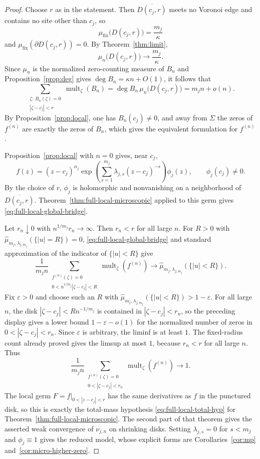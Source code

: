 \documentclass[reqno]{article}
\theoremstyle{definition}
\theoremstyle{remark}
\theoremstyle{plain}
\begin{document}
\begin{proof}
Choose $r$ as in the statement. Then $\overline{D(c_j,r)}$ meets no Voronoi edge and contains no site other than $c_j$, so
$$\mu_{\mathrm{fix}}\bigl(D(c_j,r)\bigr)=\frac{m_j}{\kappa}$$
and $\mu_{\mathrm{fix}}(\partial D(c_j,r))=0$. By Theorem~\ref{thm:limit},
$$\mu_n\bigl(D(c_j,r)\bigr)\longrightarrow \frac{m_j}{\kappa}.$$
Since $\mu_n$ is the normalized zero-counting measure of $B_n$ and Proposition~\ref{prop:deg} gives $\deg B_n=\kappa n+O(1)$, it follows that
$$\sum_{\substack{\zeta:\,B_n(\zeta)=0\\ |\zeta-c_j|<r}}\operatorname{mult}_\zeta(B_n)
=\deg B_n\,\mu_n\bigl(D(c_j,r)\bigr)
=m_j n+o(n).$$
By Proposition~\ref{prop:local}, one has $B_n(c_j)\ne0$, and away from $\Sigma$ the zeros of $f^{(n)}$ are exactly the zeros of $B_n$, which gives the equivalent formulation for $f^{(n)}$.

Proposition~\ref{prop:local} with $n=0$ gives, near $c_j$,
$$
f(z)=(z-c_j)^{\alpha_j}
\exp\!\left(\sum_{s=1}^{m_j}\lambda_{j,s}(z-c_j)^{-s}\right)\phi_j(z),
\qquad \phi_j(c_j)\ne0.
$$
By the choice of $r$, $\phi_j$ is holomorphic and nonvanishing on a neighborhood of $\overline{D(c_j,r)}$. Theorem~\ref{thm:full-local-microscopic} applied to this germ gives \eqref{eq:full-local-global-bridge}.

Let $r_n\downarrow0$ with $n^{1/m_j}r_n\to\infty$. Then $r_n<r$ for all large $n$. For $R>0$ with $\widehat\mu_{m_j,\lambda_{j,m_j}}(\{|u|=R\})=0$, \eqref{eq:full-local-global-bridge} and standard approximation of the indicator of $\{|u|<R\}$ give
$$
\frac1{m_jn}
\sum_{\substack{f^{(n)}(\zeta)=0\\0<n^{1/m_j}|\zeta-c_j|<R}}
\operatorname{mult}_\zeta(f^{(n)})
\longrightarrow
\widehat\mu_{m_j,\lambda_{j,m_j}}(\{|u|<R\}).
$$
Fix $\varepsilon>0$ and choose such an $R$ with $\widehat\mu_{m_j,\lambda_{j,m_j}}(\{|u|<R\})>1-\varepsilon$. For all large $n$, the disk $|\zeta-c_j|<Rn^{-1/m_j}$ is contained in $|\zeta-c_j|<r_n$, so the preceding display gives a lower bound $1-\varepsilon-o(1)$ for the normalized number of zeros in $0<|\zeta-c_j|<r_n$. Since $\varepsilon$ is arbitrary, the liminf is at least $1$. The fixed-radius count already proved gives the limsup at most $1$, because $r_n<r$ for all large $n$. Thus
\[
\frac1{m_jn}
\sum_{\substack{f^{(n)}(\zeta)=0\\0<|\zeta-c_j|<r_n}}
\operatorname{mult}_\zeta(f^{(n)})\longrightarrow1.
\]
The local germ $F=f|_{0<|z-c_j|<r}$ has the same derivatives as $f$ in the punctured disk, so this is exactly the total-mass hypothesis \eqref{eq:full-local-total-hyp} for Theorem~\ref{thm:full-local-microscopic}. The second part of that theorem gives the asserted weak convergence of $\nu_{j,n}$ on shrinking disks. Setting $\lambda_{j,s}=0$ for $s<m_j$ and $\phi_j\equiv1$ gives the reduced model, whose explicit forms are Corollaries~\ref{cor:mp} and~\ref{cor:micro-higher-zero}.
\end{proof}
\end{document}
